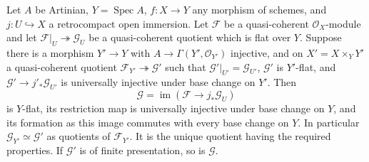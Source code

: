 \begin{theorem}
\label{A4:flatclosure}
Let $A$ be Artinian, $Y=\operatorname{Spec}A$, $f:X\to Y$ any morphism of
schemes, and $j:U\hookrightarrow X$ a retrocompact open immersion.  Let
$\mathcal F$ be a quasi-coherent $\mathcal O_X$-module and let
$\mathcal F|_U\twoheadrightarrow\mathcal G_U$ be a quasi-coherent quotient
which is flat over $Y$.
Suppose there is a morphism $Y'\to Y$ with
$A\to\Gamma(Y',\mathcal O_{Y'})$ injective, and on $X'=X\times_Y Y'$ a
quasi-coherent quotient $\mathcal F_{Y'}\twoheadrightarrow\mathcal G'$ such
that $\mathcal G'|_{U'}=\mathcal G_{U'}$, $\mathcal G'$ is $Y'$-flat, and
$\mathcal G'\to j'_*\mathcal G_{U'}$ is universally injective under base
change on $Y'$.
Then
\[
 \mathcal G=\operatorname{im}(\mathcal F\longrightarrow j_*\mathcal G_U)
\]
is $Y$-flat, its restriction map is universally injective under base change
on $Y$, and its formation as this image commutes with every base change on
$Y$.  In particular $\mathcal G_{Y'}\simeq\mathcal G'$ as quotients of
$\mathcal F_{Y'}$.  It is the unique quotient having the required properties.
If $\mathcal G'$ is of finite presentation, so is $\mathcal G$.
\end{theorem}
